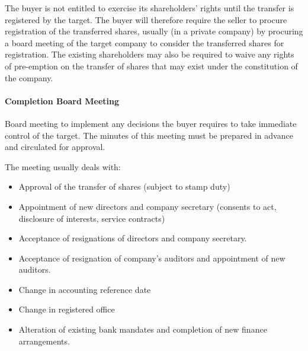 \documentclass[
]{article}
\providecommand{\tightlist}{%
  \setlength{\itemsep}{0pt}\setlength{\parskip}{0pt}}
\begin{document}
The buyer is not entitled to exercise its shareholders' rights until the
transfer is registered by the target. The buyer will therefore require
the seller to procure registration of the transferred shares, usually
(in a private company) by procuring a board meeting of the target
company to consider the transferred shares for registration. The
existing shareholders may also be required to waive any rights of
pre-emption on the transfer of shares that may exist under the
constitution of the company.

\hypertarget{completion-board-meeting}{%
\paragraph{Completion Board Meeting}\label{completion-board-meeting}}

Board meeting to implement any decisions the buyer requires to take
immediate control of the target. The minutes of this meeting must be
prepared in advance and circulated for approval.

The meeting usually deals with:

\begin{itemize}
\tightlist
\item
  Approval of the transfer of shares (subject to stamp duty)
\item
  Appointment of new directors and company secretary (consents to act,
  disclosure of interests, service contracts)
\item
  Acceptance of resignations of directors and company secretary.
\item
  Acceptance of resignation of company's auditors and appointment of new
  auditors.
\item
  Change in accounting reference date
\item
  Change in registered office
\item
  Alteration of existing bank mandates and completion of new finance
  arrangements.
\end{itemize}
\end{document}
